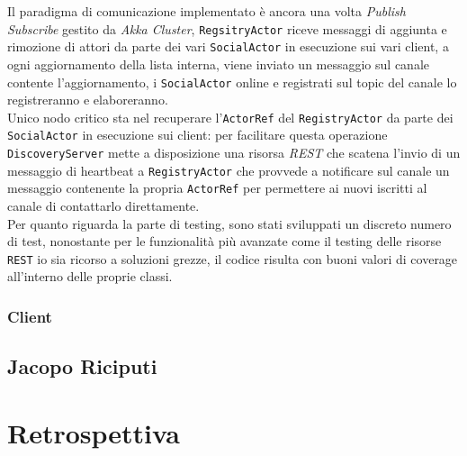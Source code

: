 Il paradigma di comunicazione implementato è ancora una volta \textit{Publish Subscribe} gestito da \textit{Akka Cluster}, \texttt{RegsitryActor} riceve messaggi di aggiunta e rimozione di attori da parte dei vari \texttt{SocialActor} in esecuzione sui vari client, a ogni aggiornamento della lista interna, viene inviato un messaggio sul canale contente l'aggiornamento, i \texttt{SocialActor} online e registrati sul topic del canale lo registreranno e elaboreranno.\\
Unico nodo critico sta nel recuperare l'\texttt{ActorRef} del \texttt{RegistryActor} da parte dei \texttt{SocialActor} in esecuzione sui client: per facilitare questa operazione \texttt{DiscoveryServer} mette a disposizione una risorsa \textit{REST} che scatena l'invio di un messaggio di heartbeat a \texttt{RegistryActor} che provvede a notificare sul canale un messaggio contenente la propria \texttt{ActorRef} per permettere ai nuovi iscritti al canale di contattarlo direttamente.\\
Per quanto riguarda la parte di testing, sono stati sviluppati un discreto numero di test, nonostante per le funzionalità più avanzate come il testing delle risorse \texttt{REST} io sia ricorso a soluzioni grezze, il codice risulta con buoni valori di coverage all'interno delle proprie classi.

\subsubsection{\textbf{Client}}

        \subsection{Jacopo Riciputi}\label{subsec:riciputi}

        \clearpage

    \section{Retrospettiva}\label{sec:retrospective}


